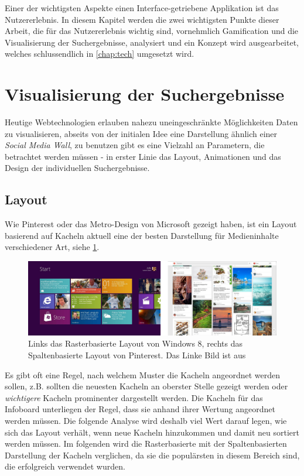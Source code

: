 \documentclass[12pt,twoside]{book}
\begin{document}
Einer der wichtigsten Aspekte einen Interface-getriebene Applikation ist das Nutzererlebnis. In diesem Kapitel werden die zwei wichtigsten Punkte dieser Arbeit, die für das Nutzererlebnis wichtig sind, vornehmlich Gamification und die Visualisierung der Suchergebnisse, analysiert und ein Konzept wird ausgearbeitet, welches schlussendlich in \ref{chap:tech} umgesetzt wird.

\section{Visualisierung der Suchergebnisse}\label{chap:concept:wall}

Heutige Webtechnologien erlauben nahezu uneingeschränkte Möglichkeiten Daten zu visualisieren, abseits von der initialen Idee eine Darstellung ähnlich einer \textit{Social Media Wall}, zu benutzen gibt es eine Vielzahl an Parametern, die betrachtet werden müssen - in erster Linie das Layout, Animationen und das Design der individuellen Suchergebnisse.

\subsection{Layout}

Wie Pinterest\cite{pinterest} oder das Metro-Design von Microsoft gezeigt haben, ist ein Layout basierend auf Kacheln aktuell eine der besten Darstellung für Medieninhalte verschiedener Art, siehe \ref{fig:metro_pinterest}.

\begin{figure}[h]
    \centering
    \includegraphics[width=1.0\textwidth]{images/metro_pinterest.png}
    \caption{Links das Rasterbasierte Layout von Windows 8, rechts das Spaltenbasierte Layout von Pinterest. Das Linke Bild ist aus \cite{metrodesign}}
    \label{fig:metro_pinterest}
  \end{figure}

Es gibt oft eine Regel, nach welchem Muster die Kacheln angeordnet werden sollen, z.B. sollten die neuesten Kacheln an oberster Stelle gezeigt werden oder \textit{wichtigere} Kacheln prominenter dargestellt werden. Die Kacheln für das Infoboard unterliegen der Regel, dass sie anhand ihrer Wertung angeordnet werden müssen. Die folgende Analyse wird deshalb viel Wert darauf legen, wie sich das Layout verhält, wenn neue Kacheln hinzukommen und damit neu sortiert werden müssen.
Im folgenden wird die Rasterbasierte mit der Spaltenbasierten Darstellung der Kacheln verglichen, da sie die populärsten in diesem Bereich sind, die erfolgreich verwendet wurden.
\end{document}
